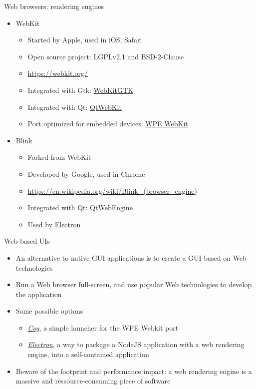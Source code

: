 \begin{frame}{Web browsers: rendering engines}
  \begin{itemize}
  \item WebKit
    \begin{itemize}
    \item Started by Apple, used in iOS, Safari
    \item Open source project: LGPLv2.1 and BSD-2-Clause
    \item \url{https://webkit.org/}
    \item Integrated with Gtk: \href{https://webkitgtk.org/}{WebKitGTK}
    \item Integrated with Qt: \href{https://wiki.qt.io/Qt_WebKit}{QtWebKit}
    \item Port optimized for embedded devices: \href{https://wpewebkit.org/}{WPE WebKit}
    \end{itemize}
  \item Blink
    \begin{itemize}
    \item Forked from WebKit
    \item Developed by Google, used in Chrome
    \item \url{https://en.wikipedia.org/wiki/Blink_(browser_engine)}
    \item Integrated with Qt: \href{https://wiki.qt.io/QtWebEngine}{QtWebEngine}
    \item Used by \href{https://www.electronjs.org/}{Electron}
    \end{itemize}
  \end{itemize}
\end{frame}

\begin{frame}{Web-based UIs}
  \begin{itemize}
  \item An alternative to native GUI applications is to create a GUI
    based on Web technologies
  \item Run a Web browser full-screen, and use popular Web
    technologies to develop the application
  \item Some possible options
    \begin{itemize}
    \item {\em \href{https://github.com/Igalia/cog}{Cog}},
      a simple launcher for the WPE Webkit port
    \item {\em \href{https://www.electronjs.org/}{Electron}},
      a way to package a NodeJS application with a
      web rendering engine, into a self-contained application
    \end{itemize}
  \item Beware of the footprint and performance impact: a web
    rendering engine is a massive and ressource-consuming piece of
    software
  \end{itemize}
\end{frame}

